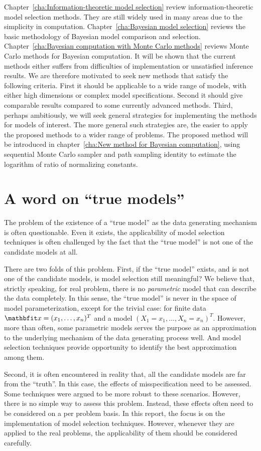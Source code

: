 Chapter~\ref{cha:Information-theoretic model selection} review
information-theoretic model selection methods. They are still widely used in
many areas due to the simplicity in computation. Chapter~\ref{cha:Bayesian
  model selection} reviews the basic methodology of Bayesian model comparison
and selection. Chapter~\ref{cha:Bayesian computation with Monte Carlo methods}
reviews Monte Carlo methods for Bayesian computation. It will be shown that
the current methods either suffers from difficulties of implementation or
unsatisfied inference results. We are therefore motivated to seek new methods
that satisfy the following criteria. First it should be applicable to a wide
range of models, with either high dimensions or complex model specifications.
Second it should give comparable results compared to some currently advanced
methods. Third, perhaps ambitiously, we will seek general strategies for
implementing the methods for models of interest. The more general such
strategies are, the easier to apply the proposed methods to a wider range of
problems. The proposed method will be introduced in chapter~\ref{cha:New
  method for Bayesian computation}, using sequential Monte Carlo sampler and
path sampling identity to estimate the logarithm of ratio of normalizing
constants.

\section{A word on ``true models''}
\label{sec:A word on true models}

The problem of the existence of a ``true model'' as the data generating
mechanism is often questionable. Even it exists, the applicability of model
selection techniques is often challenged by the fact that the ``true model''
is not one of the candidate models at all.

There are two folds of this problem. First, if the ``true model'' exists, and
is not one of the candidate models, is model selection still meaningful? We
believe that, strictly speaking, for real problem, there is no
\emph{parametric} model that can describe the data completely. In this sense,
the ``true model'' is never in the space of model parameterization, except for
the trivial case: for finite data $\bfx = (x_1,\dots,x_n)^T$ and a model $(X_1
= x_1,\dots,X_n = x_n)^T$. However, more than often, some parametric models
serves the purpose as an approximation to the underlying mechanism of the data
generating process well. And model selection techniques provide opportunity to
identify the best approximation among them.

Second, it is often encountered in reality that, all the candidate models are
far from the ``truth''. In this case, the effects of misspecification need to
be assessed. Some techniques were argued to be more robust to these scenarios.
However, there is no simple way to assess this problem. Instead, these effects
often need to be considered on a per problem basis. In this report, the focus
is on the implementation of model selection techniques. However, whenever they
are applied to the real problems, the applicability of them should be
considered carefully.

